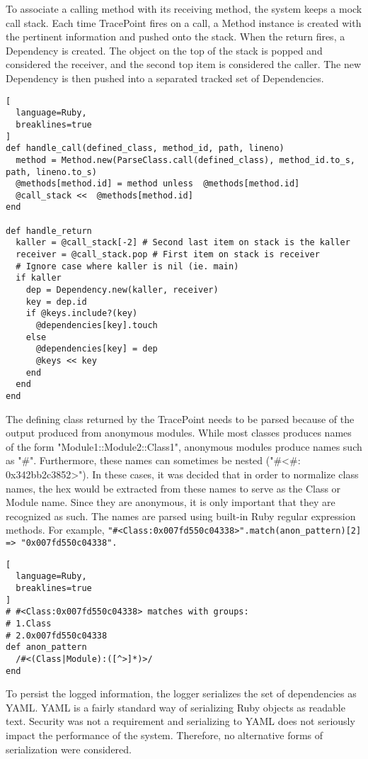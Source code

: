 \begin{centers}
To associate a calling method with its receiving method, the system keeps a mock call stack. Each time TracePoint fires on a call, a Method instance is created with the pertinent information and pushed onto the stack. When the return fires, a Dependency is created. The object on the top of the stack is popped and considered the receiver, and the second top item is considered the caller. The new Dependency is then pushed into a separated tracked set of Dependencies. 
\begin{lstlisting}[
  language=Ruby,
  breaklines=true
]
def handle_call(defined_class, method_id, path, lineno)
  method = Method.new(ParseClass.call(defined_class), method_id.to_s, path, lineno.to_s) 
  @methods[method.id] = method unless  @methods[method.id]
  @call_stack <<  @methods[method.id]
end

def handle_return
  kaller = @call_stack[-2] # Second last item on stack is the kaller
  receiver = @call_stack.pop # First item on stack is receiver
  # Ignore case where kaller is nil (ie. main)
  if kaller
    dep = Dependency.new(kaller, receiver)
    key = dep.id
    if @keys.include?(key)
      @dependencies[key].touch
    else
      @dependencies[key] = dep
      @keys << key
    end
  end
end
\end{lstlisting}
The defining class returned by the TracePoint needs to be parsed because of the output produced from anonymous modules. While most classes produces names of the form "Module1::Module2::Class1", anonymous modules produce names such as "\#<Module: 0x2f3423b392a>". Furthermore, these names can sometimes be nested ("\#<\#<Class: 0x4f2ab8ff83e2>: 0x342bb2c3852>").  In these cases, it was decided that in order to normalize class names, the hex would be extracted from these names to serve as the Class or Module name. Since they are anonymous, it is only important that they are recognized as such. The names are parsed using built-in Ruby regular expression methods. For example, {\lstinline[breaklines=true]|"#<Class:0x007fd550c04338>".match(anon_pattern)[2] => "0x007fd550c04338".|}
\begin{lstlisting}[
  language=Ruby,
  breaklines=true
]
# #<Class:0x007fd550c04338> matches with groups:
# 1.Class
# 2.0x007fd550c04338
def anon_pattern 
  /#<(Class|Module):([^>]*)>/
end
\end{lstlisting}

To persist the logged information, the logger serializes the set of dependencies as YAML. YAML is a fairly standard way of serializing Ruby objects as readable text. Security was not a requirement and serializing to YAML does not seriously impact the performance of the system. Therefore, no alternative forms of serialization were considered.


\end{centers}
